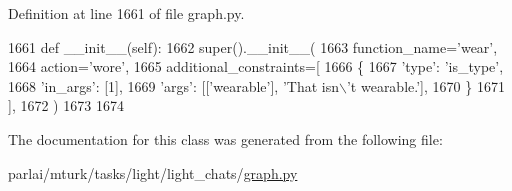 Definition at line 1661 of file graph.\+py.


\begin{DoxyCode}
1661     \textcolor{keyword}{def }\_\_init\_\_(self):
1662         super().\_\_init\_\_(
1663             function\_name=\textcolor{stringliteral}{'wear'},
1664             action=\textcolor{stringliteral}{'wore'},
1665             additional\_constraints=[
1666                 \{
1667                     \textcolor{stringliteral}{'type'}: \textcolor{stringliteral}{'is\_type'},
1668                     \textcolor{stringliteral}{'in\_args'}: [1],
1669                     \textcolor{stringliteral}{'args'}: [[\textcolor{stringliteral}{'wearable'}], \textcolor{stringliteral}{'That isn\(\backslash\)'t wearable.'}],
1670                 \}
1671             ],
1672         )
1673 
1674 
\end{DoxyCode}


The documentation for this class was generated from the following file\+:\begin{DoxyCompactItemize}
\item 
parlai/mturk/tasks/light/light\+\_\+chats/\hyperlink{parlai_2mturk_2tasks_2light_2light__chats_2graph_8py}{graph.\+py}\end{DoxyCompactItemize}
